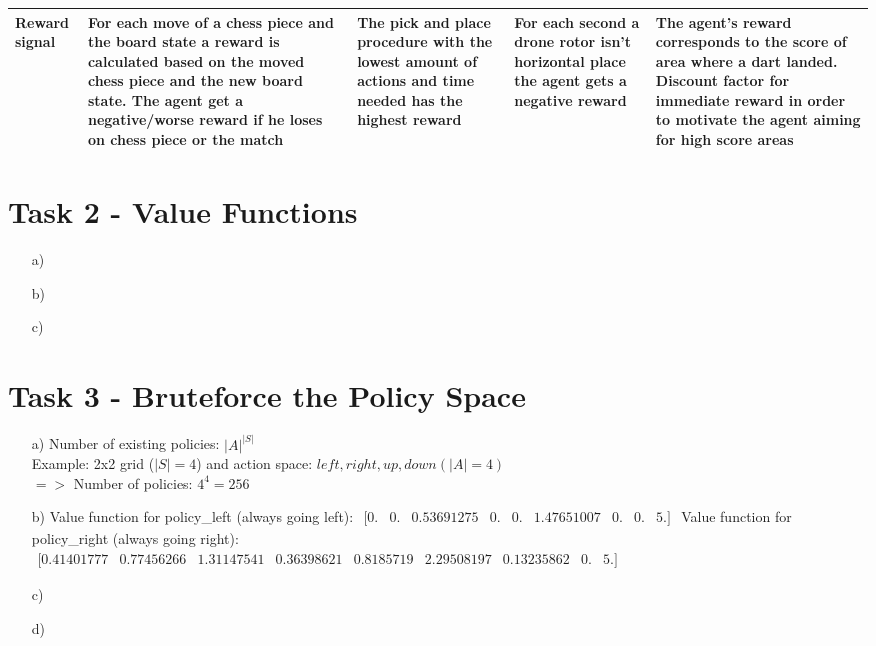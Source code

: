\documentclass[a4paper]{article}
\begin{document}
\begin{tabularx}{\textwidth} { 
    		 >{\centering}X 
    		| >{\raggedright}X 
    		| >{\raggedright\arraybackslash}X
    		| >{\raggedright\arraybackslash}X 
    		| >{\raggedright\arraybackslash}X}
    	\hline
    	\vspace{2pt} \textbf{Reward} signal  & \vspace{2pt} For each move of a chess piece and the board state a reward is calculated based on the moved chess piece and the new board state. The agent get a negative/worse reward if he loses on chess piece or the match & \vspace{2pt} The pick and place procedure with the lowest amount of actions and time needed has the highest reward & \vspace{2pt} For each second a drone rotor isn't horizontal place the agent gets a negative reward & \vspace{2pt} The agent's reward corresponds to the score of area where a dart landed. Discount factor for immediate reward in order to motivate the agent aiming for high score areas \\
    	\hline
    \end{tabularx}
	\newpage
	\section*{Task 2 - Value Functions}
	\begin{itemize}
		\item[a)]
		\item[b)]
		\item[c)]
	\end{itemize}
	\section*{Task 3 - Bruteforce the Policy Space}
		\begin{itemize}
		\item[a)] Number of existing policies:	$|A|^{|S|}$\\
				Example: 2x2 grid ($|S|=4$) and action space: $left, right, up, down (|A| = 4)$\\
				$=>$ Number of policies: $4^4 =  256$
		\item[b)] Value function for policy\_left (always going left): \hspace{0.1cm}
		$\begin{matrix}
		[0. & 0. & 0.53691275 & 0. & 0. & 1.47651007 & 0. & 0. & 5.]
		\end{matrix}$
		\newline
		\newline
		Value function for policy\_right (always going right):\\
		$\begin{matrix}
		[0.41401777 & 0.77456266 & 1.31147541 & 0.36398621 & 0.8185719 & 2.29508197 & 0.13235862 & 0. & 5.]
		\end{matrix}$
		\item[c)]
		\item[d)]
	\end{itemize}
\end{document}
